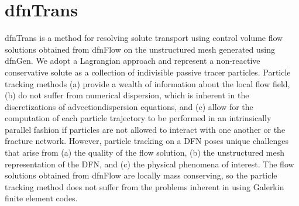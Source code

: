 \documentclass[letterpaper,10pt,english]{sphinxmanual}
\begin{document}
\begin{sphinxVerbatim}[commandchars=\\\{\}]
 
     
   

   
   


 
   
   

 
   
   

   
   

\end{sphinxVerbatim}


\chapter{dfnTrans}
\label{\detokenize{dfntrans::doc}}\label{\detokenize{dfntrans:dfntrans}}\label{\detokenize{dfntrans:dftrans-chapter}}
dfnTrans is a method for resolving solute transport using control volume flow
solutions obtained from dfnFlow on the unstructured mesh generated using dfnGen.
We adopt a Lagrangian approach and represent a non-reactive conservative solute
as a collection of indivisible passive tracer particles. Particle tracking
methods (a) provide a wealth of information about the local flow field, (b) do
not suffer from numerical dispersion, which is inherent in the discretizations
of advection\textendash{}dispersion equations, and (c) allow for the computation of each
particle trajectory to be performed in an intrinsically parallel fashion if
particles are not allowed to interact with one another or the fracture network.
However, particle tracking on a DFN poses unique challenges that arise from (a)
the quality of the flow solution, (b) the unstructured mesh representation of
the DFN, and (c) the physical phenomena of interest. The flow solutions obtained
from dfnFlow are locally mass conserving, so the particle tracking method does
not suffer from the problems inherent in using Galerkin finite element codes.
\end{document}
